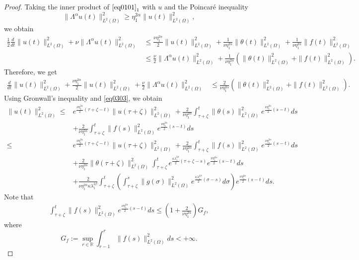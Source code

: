 \documentclass[oneside,preprint,12pt,numbers,sort&compress]{elsarticle}
\begin{document}
\begin{proof}
Taking the inner product of $\eqref{eq0101}_{1}$ with $u$ and the Poincar\'{e} inequality
$$\| \Lambda^\alpha u(t)\|_{L^2(\Omega)}^2 \geq \eta_1^{2\alpha}\|u(t)\|_{L^2(\Omega)}^2, $$
we obtain
\begin{align*}
   \frac{1}{2}\frac{d}{dt}\|u(t)\|_{L^2(\Omega)}^2 + \nu\|\Lambda^\alpha u(t)\|_{L^2(\Omega)}^2
   & \leq \frac{\nu\eta_1^{2\alpha}}{2} \|u(t)\|_{L^2(\Omega)}^2 + \frac{1}{\nu\eta_1^{2\alpha}} \|\theta(t)\|_{L^2(\Omega)}^2 + \frac{1}{\nu\eta_1^{2\alpha}} \|f(t)\|_{L^2(\Omega)}^2 \\
   & \leq \frac{\nu}{2} \|\Lambda^\alpha u(t)\|_{L^2(\Omega)}^2 + \frac{1}{\nu\eta_1^{2\alpha}} \left( \|\theta(t)\|_{L^2(\Omega)}^2 +    \|f(t)\|_{L^2(\Omega)}^2 \right).
\end{align*}
Therefore, we get
\begin{align}\label{eq0304}
   \frac{d}{dt}\|u(t)\|_{L^2(\Omega)}^2 + \frac{\nu\eta_1^{2\alpha}}{2} \|u(t)\|_{L^2(\Omega)}^2 + \frac{\nu}{2} \|\Lambda^\alpha u(t)\|_{L^2(\Omega)}^2
   & \leq \frac{2}{\nu\eta_1^{2\alpha}} \left( \|\theta(t)\|_{L^2(\Omega)}^2 +    \|f(t)\|_{L^2(\Omega)}^2 \right).
\end{align}
Using Gronwall's inequality and \cref{eq0303}, we obtain
\begin{align*} 
   \|u(t)\|_{L^2(\Omega)}^2
   \leq 
   & e^{\frac{\nu\eta_1^{2\alpha}}{2}(\tau+\zeta-t)} \|u(\tau+\zeta)\|_{L^2(\Omega)}^2 
   + \frac{2}{\nu\eta_1^{2\alpha}} \int_{\tau+\zeta}^{t} \|\theta(s)\|_{L^2(\Omega)}^2 e^{\frac{\nu\eta_1^{2\alpha}}{2}(s-t)} ds \\
   &+ \frac{2}{\nu\eta_1^{2\alpha}} \int_{\tau+\zeta}^{t}  \|f(s)\|_{L^2(\Omega)}^2 e^{\frac{\nu\eta_1^{2\alpha}}{2}(s-t)} ds \\
   \leq 
   & e^{\frac{\nu\eta_1^{2\alpha}}{2}(\tau+\zeta-t)} \|u(\tau+\zeta)\|_{L^2(\Omega)}^2 
   + \frac{2}{\nu\eta_1^{2\alpha}} \int_{\tau+\zeta}^{t}  \|f(s)\|_{L^2(\Omega)}^2 e^{\frac{\nu\eta_1^{2\alpha}}{2}(s-t)} ds \\
   &
   + \frac{2}{\nu\eta_1^{2\alpha}} \|\theta(\tau+\zeta)\|_{L^2(\Omega)}^2  \int_{\tau+\zeta}^{t} e^{\frac{\kappa\lambda_{1}^{2\beta}}{2}(\tau+\zeta-s)} e^{\frac{\nu\eta_1^{2\alpha}}{2}(s-t)} ds \\
   &
   + \frac{2}{\nu\eta_1^{2\alpha}\kappa\lambda_{1}^{2\beta}} \int_{\tau+\zeta}^{t} \left( \int_{\tau+\zeta}^{s} \|g(\sigma)\|_{L^2(\Omega)}^2 e^{\frac{\kappa\lambda_{1}^{2\beta}}{2}(\sigma-s)} d\sigma \right) e^{\frac{\nu\eta_1^{2\alpha}}{2}(s-t)} ds.
\end{align*}
Note that
\begin{align*}
   \int_{\tau+\zeta}^{t}  \|f(s)\|_{L^2(\Omega)}^2 e^{\frac{\nu\eta_1^{2\alpha}}{2}(s-t)} ds
   \leq \left(1+\frac{2}{\nu\eta_1^{2\alpha}}\right)G_f,
\end{align*}
where
$$G_f:=\sup_{r \in \mathbb{R}}\int_{r-1}^{r}\|f(s)\|_{L^2(\Omega)}^2 ds< +\infty.$$


\end{proof}
\end{document}
